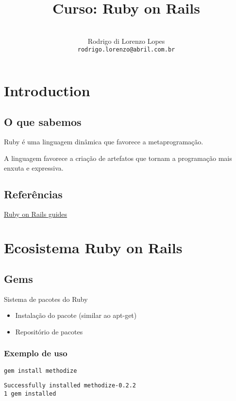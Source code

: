 \documentclass[serif,mathserif]{article}
\author{ 
    \\ Rodrigo di Lorenzo Lopes \\  \texttt{rodrigo.lorenzo@abril.com.br}
}
\title{Curso: Ruby on Rails}
\begin{document}
\maketitle
 
\tableofcontents

\section{Introduction}

\subsection{O que sabemos}

Ruby é uma linguagem dinâmica que favorece a metaprogramação.

A linguagem favorece a criação de artefatos que tornam a programação mais enxuta e expressiva.

\subsection{Referências}

\href{http://guias.rubyonrails.com.br/}{Ruby on Rails guides}

\section{Ecosistema Ruby on Rails}

\subsection{Gems}

Sistema de pacotes do Ruby

\begin{itemize}
  \item Instalação do pacote (similar ao apt-get)
  \item Repositório de pacotes 
\end{itemize}

\subsubsection{Exemplo de uso}
\begin{lstlisting}
gem install methodize
\end{lstlisting}

\begin{verbatim}
Successfully installed methodize-0.2.2
1 gem installed
\end{verbatim}
\end{document}
